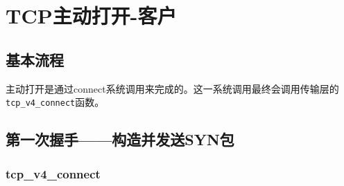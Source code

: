 \documentclass[11pt, a4paper,oneside]{book}
\theoremstyle{ocrenumbox}
\theoremstyle{purplenumbox}
\theoremstyle{blackbox}
\begin{document}
\minitoc

    \section{TCP主动打开-客户}
        \subsection{基本流程}
        主动打开是通过connect系统调用来完成的。这一系统调用最终会调用传输层的\texttt{tcp_v4_connect}函数。
        \subsection{第一次握手——构造并发送SYN包}
\subsubsection{tcp\_v4\_connect}
\end{document}
